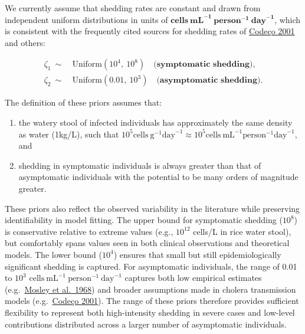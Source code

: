 \documentclass[
]{book}
\providecommand{\tightlist}{%
  \setlength{\itemsep}{0pt}\setlength{\parskip}{0pt}}
\begin{document}
We currently assume that shedding rates are constant and drawn from independent uniform distributions in units of \(\mathbf{\text{cells}~\text{mL}^{-1}~\text{person}^{-1}~\text{day}^{-1}}\), which is consistent with the frequently cited sources for shedding rates of \href{https://doi.org/10.1186/1471-2334-1-1}{Codeço 2001} and others:

\[
\begin{aligned}
\zeta_1 \ \sim \ &\text{Uniform}(10^4,\ 10^{8}) \quad \mathbf{\text{(symptomatic shedding)}},\\
\zeta_2 \ \sim \ &\text{Uniform}(0.01,\ 10^3) \quad \mathbf{\text{(asymptomatic shedding)}}.
\end{aligned}
\label{eq:shedding}
\]

The definition of these priors assumes that:

\begin{enumerate}
\def\labelenumi{\arabic{enumi})}
\tightlist
\item
  the watery stool of infected individuals has approximately the same density as water (1kg/L), such that \(10^5 \text{cells}~\text{g}^{-1}\text{day}^{-1} \approx 10^5 \text{cells}~\text{mL}^{-1}\text{person}^{-1}\text{day}^{-1}\), and
\item
  shedding in symptomatic individuals is always greater than that of asymptomatic individuals with the potential to be many orders of magnitude greater.
\end{enumerate}

These priors also reflect the observed variability in the literature while preserving identifiability in model fitting. The upper bound for symptomatic shedding (\(10^8\)) is conservative relative to extreme values (e.g., \(10^{12}\) cells/L in rice water stool), but comfortably spans values seen in both clinical observations and theoretical models. The lower bound (\(10^4\)) ensures that small but still epidemiologically significant shedding is captured. For asymptomatic individuals, the range of 0.01 to \(10^3\) \(\text{cells}~\text{mL}^{-1}~\text{person}^{-1}~\text{day}^{-1}\) captures both low empirical estimates (e.g.~\href{https://www.ncbi.nlm.nih.gov/pmc/articles/PMC2554681/}{Mosley et al.~1968}) and broader assumptions made in cholera transmission models (e.g.~\href{https://doi.org/10.1186/1471-2334-1-1}{Codeço 2001}). The range of these priors therefore provides sufficient flexibility to represent both high-intensity shedding in severe cases and low-level contributions distributed across a larger number of asymptomatic individuals.
\end{document}
